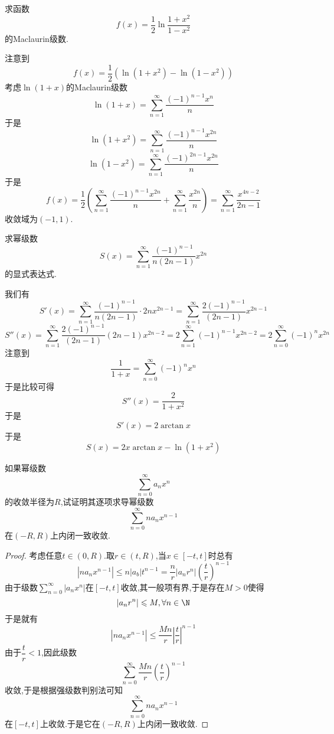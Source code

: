 \documentclass{ctexart}
\begin{document}
\pagestyle{empty}
\begin{center}
    \large{}
\end{center}
\begin{problem}[L.11.1]
    求函数
    \[f(x)=\dfrac{1}{2}\ln\dfrac{1+x^2}{1-x^2}\]
    的Maclaurin级数.
\end{problem}
\begin{solution}
    注意到
    \[f(x)=\dfrac12\left(\ln\left(1+x^2\right)-\ln\left(1-x^2\right)\right)\]
    考虑$\ln(1+x)$的Maclaurin级数
    \[\ln(1+x)=\sum_{n=1}^\infty\dfrac{(-1)^{n-1}x^n}{n}\]
    于是
    \[\ln\left(1+x^2\right)=\sum_{n=1}^\infty\dfrac{(-1)^{n-1}x^{2n}}{n}\]
    \[\ln\left(1-x^2\right)=\sum_{n=1}^\infty\dfrac{(-1)^{2n-1}x^{2n}}{n}\]
    于是
    \[f(x)=\dfrac12\left(\sum_{n=1}^\infty\dfrac{(-1)^{n-1}x^{2n}}{n}+\sum_{n=1}^\infty\dfrac{x^{2n}}{n}\right)
    =\sum_{n=1}^\infty\dfrac{x^{4n-2}}{2n-1}\]
    收敛域为$(-1,1)$.
\end{solution}
\begin{problem}[L.11.2]
    求幂级数
    \[S(x)=\sum_{n=1}^\infty\dfrac{(-1)^{n-1}}{n(2n-1)}x^{2n}\]
    的显式表达式.
\end{problem}
\begin{solution}
    我们有
    \[S'(x)=\sum_{n=1}^\infty\dfrac{(-1)^{n-1}}{n(2n-1)}\cdot 2nx^{2n-1}
    =\sum_{n=1}^\infty\dfrac{2(-1)^{n-1}}{(2n-1)}x^{2n-1}\]
    \[S''(x)=\sum_{n=1}^\infty\dfrac{2(-1)^{n-1}}{(2n-1)}(2n-1)x^{2n-2}
    =2\sum_{n=1}^\infty(-1)^{n-1}x^{2n-2}=2\sum_{n=0}^\infty(-1)^nx^{2n}\]
    注意到
    \[\dfrac{1}{1+x}=\sum_{n=0}^\infty(-1)^nx^n\]
    于是比较可得
    \[S''(x)=\dfrac{2}{1+x^2}\]
    于是
    \[S'(x)=2\arctan x\]
    于是
    \[S(x)=2x\arctan x-\ln\left(1+x^2\right)\]

\end{solution}
\begin{problem}[L.11.3]
    如果幂级数
    \[\sum_{n=0}^\infty a_nx^n\]
    的收敛半径为$R$,试证明其逐项求导幂级数
    \[\sum_{n=0}^\infty na_nx^{n-1}\]
    在$(-R,R)$上内闭一致收敛.
\end{problem}
\begin{proof}
    考虑任意$t\in(0,R)$.取$r\in(t,R)$,当$x\in[-t,t]$时总有
    \[\left|na_nx^{n-1}\right|
    \leqslant n\left|a_b\right|t^{n-1}
    =\dfrac{n}{r}\left|a_nr^n\right|\left(\dfrac{t}{r}\right)^{n-1}\]
    由于级数$\displaystyle\sum_{n=0}^\infty\left|a_nx^n\right|$在$[-t,t]$收敛,其一般项有界,于是存在$M>0$使得
    \[\left|a_nr^n\right|\leqslant M,\forall n\in\N\]
    于是就有
    \[\left|na_nx^{n-1}\right|
    \leqslant\dfrac{Mn}{r}\left|\dfrac{t}{r}\right|^{n-1}\]
    由于$\dfrac{t}{r}<1$,因此级数
    \[\sum_{n=0}^\infty\dfrac{Mn}{r}\left(\dfrac tr\right)^{n-1}\]
    收敛,于是根据强级数判别法可知
    \[\sum_{n=0}^\infty na_nx^{n-1}\]
    在$[-t,t]$上收敛.于是它在$(-R,R)$上内闭一致收敛.
\end{proof}
\end{document}
